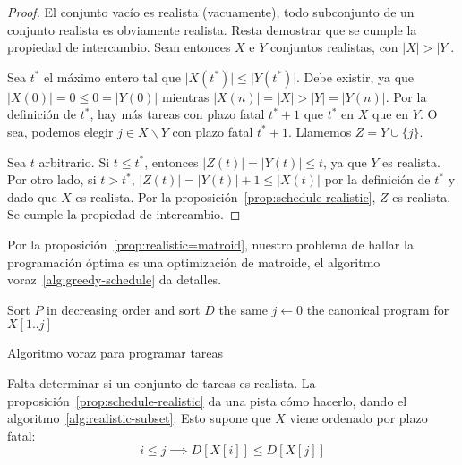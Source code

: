  \begin{proof}
    El conjunto vacío es realista
    (vacuamente),
    todo subconjunto de un conjunto realista es obviamente realista.
    Resta demostrar que se cumple la propiedad de intercambio.
    Sean entonces \(X\) e \(Y\) conjuntos realistas,
    con \(\lvert X \rvert > \lvert Y \rvert\).

    Sea \(t^*\) el máximo entero
    tal que \(\lvert X(t^*) \rvert \le \lvert Y(t^*) \rvert\).
    Debe existir,
    ya que \(\lvert X(0) \rvert = 0 \le 0 = \lvert Y(0) \rvert\)
    mientras
    \(\lvert X(n) \rvert
        = \lvert X \rvert
        > \lvert Y \rvert
        = \lvert Y(n) \rvert\).
    Por la definición de \(t^*\),
    hay más tareas con plazo fatal \(t^* + 1\) que \(t^*\)
    en \(X\) que en \(Y\).
    O sea,
    podemos elegir \(j \in X \smallsetminus Y\) con plazo fatal \(t^* + 1\).
    Llamemos \(Z = Y \cup \{ j \}\).

    Sea \(t\) arbitrario.
    Si \(t \le t^*\),
    entonces \(\lvert Z(t) \rvert = \lvert Y(t) \rvert \le t\),
    ya que \(Y\) es realista.
    Por otro lado,
    si \(t > t^*\),
    \(\lvert Z(t) \rvert = \lvert Y(t) \rvert + 1 \le \lvert X(t) \rvert\)
    por la definición de \(t^*\) y dado que \(X\) es realista.
    Por la proposición~\ref{prop:schedule-realistic},
    \(Z\) es realista.
    Se cumple la propiedad de intercambio.
  \end{proof}
  Por la proposición~\ref{prop:realistic=matroid},
  nuestro problema de hallar la programación óptima
  es una optimización de matroide,
  el algoritmo voraz~\ref{alg:greedy-schedule} da detalles.
  \begin{algorithm}
    \DontPrintSemicolon\Indp

    Sort \(P\) in decreasing order
      and sort \(D\) the same \;
    \(j \gets 0\) \;
    \Return the canonical program for \(X[1 .. j]\) \;

    \caption{Algoritmo voraz para programar tareas}
    \label{alg:greedy-schedule}
  \end{algorithm}
  Falta determinar si un conjunto de tareas es realista.
  La proposición~\ref{prop:schedule-realistic}
  da una pista cómo hacerlo,
  dando el algoritmo~\ref{alg:realistic-subset}.
  Esto supone que \(X\) viene ordenado por plazo fatal:
  \begin{equation*}
    i \le j
      \implies D[X[i]] \le D[X[j]]
  \end{equation*}
